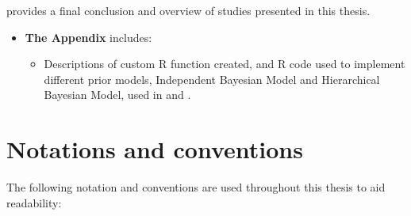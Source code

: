 \newpara

 \textbf{} provides a final conclusion and overview of studies presented in this thesis.

\newpara

\begin{itemize}
	\item  \textbf{The Appendix} includes:
	\begin{itemize}
		\item  Descriptions of custom R function created, and R code used to implement different prior models, Independent Bayesian Model and Hierarchical Bayesian Model, used in  and .
	\end{itemize}
\end{itemize}

\newpage
\section{Notations and conventions}

The following notation and conventions are used throughout this thesis to aid\\ readability:

\newpara


